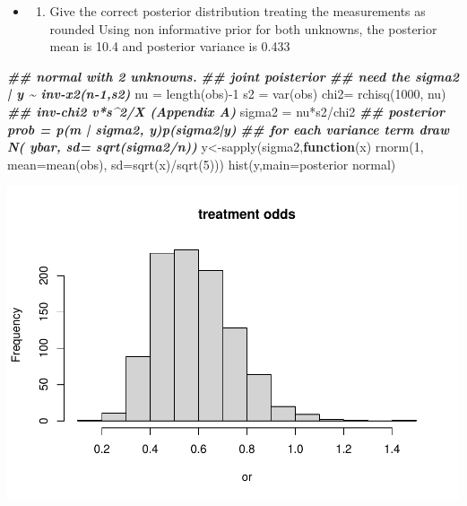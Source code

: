 \documentclass[
]{book}
\newenvironment{Shaded}{\begin{snugshade}}{\end{snugshade}}
\newcommand{\AttributeTok}[1]{\textcolor[rgb]{0.77,0.63,0.00}{#1}}
\newcommand{\ControlFlowTok}[1]{\textcolor[rgb]{0.13,0.29,0.53}{\textbf{#1}}}
\newcommand{\DecValTok}[1]{\textcolor[rgb]{0.00,0.00,0.81}{#1}}
\newcommand{\DocumentationTok}[1]{\textcolor[rgb]{0.56,0.35,0.01}{\textbf{\textit{#1}}}}
\newcommand{\FunctionTok}[1]{\textcolor[rgb]{0.00,0.00,0.00}{#1}}
\newcommand{\NormalTok}[1]{#1}
\newcommand{\OtherTok}[1]{\textcolor[rgb]{0.56,0.35,0.01}{#1}}
\newcommand{\SpecialCharTok}[1]{\textcolor[rgb]{0.00,0.00,0.00}{#1}}
\newcommand{\StringTok}[1]{\textcolor[rgb]{0.31,0.60,0.02}{#1}}
\providecommand{\tightlist}{%
  \setlength{\itemsep}{0pt}\setlength{\parskip}{0pt}}
\theoremstyle{definition}
\theoremstyle{definition}
\theoremstyle{definition}
\theoremstyle{definition}
\theoremstyle{remark}
\begin{document}
\begin{itemize}
\item
  \begin{enumerate}
  \def\labelenumi{(\alph{enumi})}
  \setcounter{enumi}{1}
  \tightlist
  \item
    Give the correct posterior distribution treating the measurements as rounded
    Using non informative prior for both unknowns, the posterior mean is 10.4 and posterior variance is 0.433
  \end{enumerate}
\end{itemize}

\begin{Shaded}
\begin{Highlighting}[]
 \DocumentationTok{\#\# normal with 2 unknowns.}
 \DocumentationTok{\#\# joint poisterior}
 \DocumentationTok{\#\# need the  sigma2 | y \textasciitilde{} inv{-}x2(n{-}1,s2)}
\NormalTok{  nu }\OtherTok{=} \FunctionTok{length}\NormalTok{(obs)}\SpecialCharTok{{-}}\DecValTok{1}
\NormalTok{  s2 }\OtherTok{=} \FunctionTok{var}\NormalTok{(obs)}
\NormalTok{  chi2}\OtherTok{=} \FunctionTok{rchisq}\NormalTok{(}\DecValTok{1000}\NormalTok{, nu)}
   \DocumentationTok{\#\# inv{-}chi2  v*s\^{}2/X  (Appendix A)}
\NormalTok{  sigma2 }\OtherTok{=}\NormalTok{ nu}\SpecialCharTok{*}\NormalTok{s2}\SpecialCharTok{/}\NormalTok{chi2}
  \DocumentationTok{\#\# posterior prob   =  p(m | sigma2, y)p(sigma2|y)}
   \DocumentationTok{\#\# for each variance term  draw   N( ybar,  sd= sqrt(sigma2/n))}
\NormalTok{  y}\OtherTok{\textless{}{-}}\FunctionTok{sapply}\NormalTok{(sigma2,}\ControlFlowTok{function}\NormalTok{(x) }\FunctionTok{rnorm}\NormalTok{(}\DecValTok{1}\NormalTok{, }\AttributeTok{mean=}\FunctionTok{mean}\NormalTok{(obs), }\AttributeTok{sd=}\FunctionTok{sqrt}\NormalTok{(x)}\SpecialCharTok{/}\FunctionTok{sqrt}\NormalTok{(}\DecValTok{5}\NormalTok{)))}
  \FunctionTok{hist}\NormalTok{(y,}\AttributeTok{main=}\StringTok{\textquotesingle{}posterior normal\textquotesingle{}}\NormalTok{)}
\end{Highlighting}
\end{Shaded}

\includegraphics{_main_files/figure-latex/unnamed-chunk-37-1.pdf}
\end{document}
